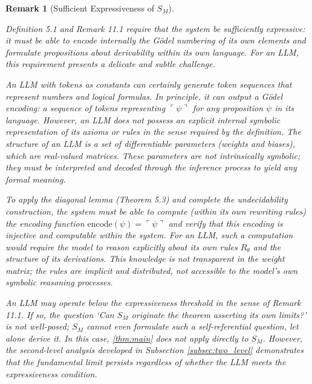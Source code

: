 \documentclass[11pt]{article}
\newtheorem{remark}[theorem]{Remark}
\begin{document}
\begin{remark}[Sufficient Expressiveness of $S_M$]
\label{rem:expressiveness_llm}

Definition 5.1 and Remark 11.1 require that the system be \textit{sufficiently expressive}: it must be able to encode internally the Gödel numbering of its own elements and formulate propositions about derivability within its own language. For an LLM, this requirement presents a delicate and subtle challenge.

An LLM with tokens as constants can certainly generate token sequences that represent numbers and logical formulas. In principle, it can output a Gödel encoding: a sequence of tokens representing $\ulcorner \psi \urcorner$ for any proposition $\psi$ in its language. However, an LLM does not possess an \textit{explicit internal symbolic representation} of its axioms or rules in the sense required by the definition. The structure of an LLM is a set of differentiable parameters (weights and biases), which are real-valued matrices. These parameters are not intrinsically symbolic; they must be interpreted and decoded through the inference process to yield any formal meaning.

To apply the diagonal lemma (Theorem 5.3) and complete the undecidability construction, the system must be able to compute (within its own rewriting rules) the encoding function $\text{encode}(\psi) = \ulcorner \psi \urcorner$ and verify that this encoding is injective and computable within the system. For an LLM, such a computation would require the model to reason explicitly about its own rules $R_\theta$ and the structure of its derivations. This knowledge is not transparent in the weight matrix; the rules are implicit and distributed, not accessible to the model's own symbolic reasoning processes.

An LLM may operate \textit{below the expressiveness threshold} in the sense of Remark 11.1. If so, the question `Can $S_M$ originate the theorem asserting its own limits?' is not well-posed; $S_M$ cannot even formulate such a self-referential question, let alone derive it. In this case, \ref{thm:main} does not apply directly to $S_M$. However, the second-level analysis developed in Subsection \ref{subsec:two_level} demonstrates that the fundamental limit persists regardless of whether the LLM meets the expressiveness condition.

\end{remark}
\end{document}
